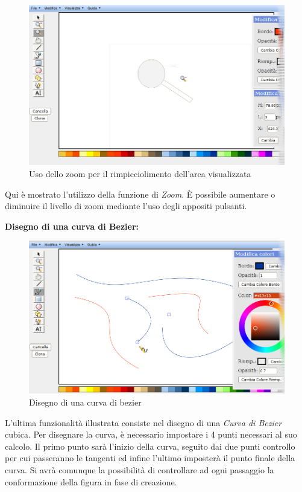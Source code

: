 \begin{figure}[!ht]
\centering
\includegraphics[scale=0.4]{images/zoom_meno.png}
\caption{Uso dello zoom per il rimpicciolimento dell'area visualizzata}
\end{figure}
 
\vspace{20pt}
Qui \`e mostrato l'utilizzo della funzione di \textit{Zoom}. \`E possibile aumentare o diminuire il livello di zoom mediante l'uso degli appositi pulsanti.
\newpage
 
\textbf{Disegno di una curva di Bezier:}\\
\begin{figure}[!ht]
\centering
\includegraphics[scale=0.4]{images/bezier.png}
\caption{Disegno di una curva di bezier}
\end{figure}
 
\vspace{100pt}
 
L'ultima funzionalit\` a illustrata consiste nel disegno di una \textit{Curva di Bezier} cubica. Per disegnare la curva, \` e necessario impostare i 4 punti necessari al suo calcolo. Il primo punto sar\`a l'inizio della curva, seguito dai due punti controllo per cui passeranno le tangenti ed infine l'ultimo imposter\` a il punto finale della curva. Si avr\` a comunque la possibilit\` a di controllare ad ogni passaggio la conformazione della figura in fase di creazione.
 
